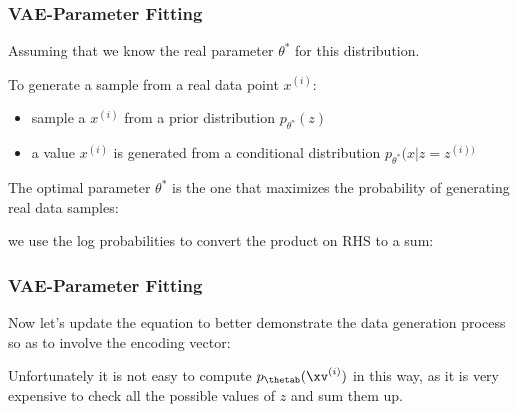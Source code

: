\begin{frame}
\frametitle{VAE-Parameter Fitting}
\vspace{2mm}

Assuming that we know the real parameter ${\theta}^*$ for this distribution. 

To generate a sample from a real data point $x^{(i)}$:

\begin{itemize}
\item sample a $x^{(i)}$ from a prior distribution $p_{{\theta}^*} (z)$
\item a value $x^{(i)}$ is generated from a conditional distribution $p_{{\theta}^*} (x|z=z^{(i))}$ 
\end{itemize}

\vspace{1mm}
The optimal parameter ${\theta}^*$ is the one that maximizes the probability of generating real data samples:

\vspace{2mm}
\vspace{2mm}

we use the log probabilities to convert the product on RHS to a sum:

\vspace{2mm}

\end{frame}  




\begin{frame}
\frametitle{VAE-Parameter Fitting}
\vspace{2mm}

Now let's update the equation to better demonstrate the data generation process so as to involve the encoding vector:

\vspace{2mm}

\vspace{2mm}

Unfortunately it is not easy to compute $ p_{\thetab} (\xv^{(i)}) $ in this way, as it is very expensive to check all the possible values of $z$ and sum them up.
\end{frame}




